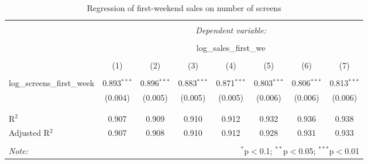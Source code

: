 \begin{table}[!htbp] \centering 
	\caption{Regression of first-weekend sales on number of screens} 
	\label{part2.1_tab1} 
	\begin{tabular}{@{\extracolsep{5pt}}lccccccc} 
		\\[-1.8ex]\hline 
		\hline \\[-1.8ex] 
		& \multicolumn{7}{c}{\textit{Dependent variable:}} \\ 
		\cline{2-8} 
		\\[-1.8ex] & \multicolumn{7}{c}{log\_sales\_first\_we} \\ 
		\\[-1.8ex] & (1) & (2) & (3) & (4) & (5) & (6) & (7)\\ 
		\hline \\[-1.8ex] 
		log\_screens\_first\_week & 0.893$^{***}$ & 0.896$^{***}$ & 0.883$^{***}$ & 0.871$^{***}$ & 0.803$^{***}$ & 0.806$^{***}$ & 0.813$^{***}$ \\ 
		& (0.004) & (0.005) & (0.005) & (0.005) & (0.006) & (0.006) & (0.006) \\ 
		& & & & & & & \\ 
		\hline \\[-1.8ex] 
		R$^{2}$ & 0.907 & 0.909 & 0.910 & 0.912 & 0.932 & 0.936 & 0.938 \\ 
		Adjusted R$^{2}$ & 0.907 & 0.908 & 0.910 & 0.912 & 0.928 & 0.931 & 0.933 \\ 
		\hline 
		\hline \\[-1.8ex] 
		\textit{Note:}  & \multicolumn{7}{r}{$^{*}$p$<$0.1; $^{**}$p$<$0.05; $^{***}$p$<$0.01} \\ 
	\end{tabular} 
\end{table} 
